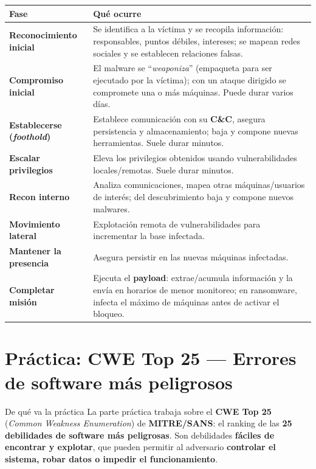 \documentclass[11pt,a4paper]{article}
\begin{document}
\begin{center}
\renewcommand{\arraystretch}{1.3}
\begin{tabular}{>{\bfseries}p{3.4cm} p{9.2cm}}
\toprule
Fase & Qué ocurre \\
\midrule
Reconocimiento inicial & Se identifica a la víctima y se recopila información: responsables,
puntos débiles, intereses; se mapean redes sociales y se establecen relaciones falsas.\\
Compromiso inicial & El malware se ``\emph{weaponiza}'' (empaqueta para ser ejecutado por la
víctima); con un ataque dirigido se compromete una o más máquinas. Puede durar varios días.\\
Establecerse (\emph{foothold}) & Establece comunicación con su \textbf{C\&C}, asegura
persistencia y almacenamiento; baja y compone nuevas herramientas. Suele durar minutos.\\
Escalar privilegios & Eleva los privilegios obtenidos usando vulnerabilidades locales/remotas.
Suele durar minutos.\\
Recon interno & Analiza comunicaciones, mapea otras máquinas/usuarios de interés; del
descubrimiento baja y compone nuevos malwares.\\
Movimiento lateral & Explotación remota de vulnerabilidades para incrementar la base infectada.\\
Mantener la presencia & Asegura persistir en las nuevas máquinas infectadas.\\
Completar misión & Ejecuta el \textbf{payload}: extrae/acumula información y la envía en horarios
de menor monitoreo; en ransomware, infecta el máximo de máquinas antes de activar el bloqueo.\\
\bottomrule
\end{tabular}
\end{center}

\section{Práctica: CWE Top 25 — Errores de software más peligrosos}

\begin{practbox}{De qué va la práctica}
La parte práctica trabaja sobre el \textbf{CWE Top 25} (\emph{Common Weakness Enumeration}) de
\textbf{MITRE/SANS}: el ranking de las \textbf{25 debilidades de software más peligrosas}. Son
debilidades \textbf{fáciles de encontrar y explotar}, que pueden permitir al adversario
\textbf{controlar el sistema, robar datos o impedir el funcionamiento}.
\end{practbox}
\end{document}
